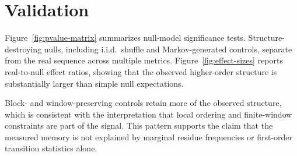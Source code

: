 \section{Validation}

Figure~\ref{fig:pvalue-matrix} summarizes null-model significance tests. Structure-destroying nulls, including i.i.d.\ shuffle and Markov-generated controls, separate from the real sequence across multiple metrics. Figure~\ref{fig:effect-sizes} reports real-to-null effect ratios, showing that the observed higher-order structure is substantially larger than simple null expectations.

Block- and window-preserving controls retain more of the observed structure, which is consistent with the interpretation that local ordering and finite-window constraints are part of the signal. This pattern supports the claim that the measured memory is not explained by marginal residue frequencies or first-order transition statistics alone.
